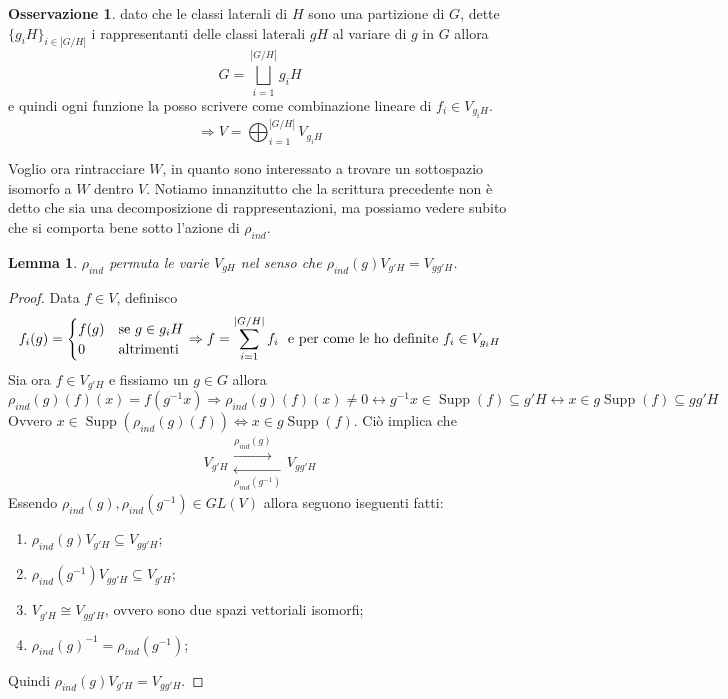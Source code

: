 \documentclass[11pt]{article}
\theoremstyle{plain}
\newtheorem{lemma}[thm]{Lemma}
\theoremstyle{definition}
\newtheorem*{rem}{Osservazione}
\theoremstyle{remark}
\DeclareMathOperator{\Supp}{Supp}
\begin{document}
\begin{rem} dato che le classi laterali di $H$ sono una partizione di $G$, dette $\{g_iH\}_{i\in |G/H|}$ i rappresentanti delle classi laterali $gH$ al variare di $g$ in $G$ allora
\[G=\bigsqcup_{i=1}^{|G/H|} g_iH\]
e quindi ogni funzione la posso scrivere come combinazione lineare di $f_i\in V_{g_iH}$.
\[\Rightarrow V=\bigoplus_{i=1}^{|G/H|} V_{g_iH}\]
\end{rem}
Voglio ora rintracciare $W$, in quanto sono interessato a trovare un sottospazio isomorfo a $W$ dentro $V$. Notiamo innanzitutto che la scrittura precedente non è detto che sia una decomposizione di rappresentazioni, ma possiamo vedere subito che si comporta bene sotto l'azione di $\rho_{ind}$.

\begin{lemma}
$\rho_{ind}$ permuta le varie $V_{gH}$ nel senso che $\rho_{ind}(g)V_{g'H}=V_{gg'H}$.
\end{lemma}

\begin{proof} Data $f\in V$, definisco
  \[f_i(g)=\begin{cases}
    f(g)& \textup{se } g\in g_iH\\
    0& \textup{altrimenti}
  \end{cases}\Rightarrow f=\sum_{i=1}^{|G/H|} f_i\ \textup{ e per come le ho definite } f_i\in V_{g_iH}\]
  Sia ora $f\in V_{g'H}$ e fissiamo un $g\in G$ allora
  \[\rho_{ind}(g)(f)(x)=f(g^{-1}x)\Rightarrow \rho_{ind}(g)(f)(x)\neq 0\leftrightarrow g^{-1}x\in \Supp(f)\subseteq g'H\leftrightarrow x\in g\Supp(f)\subseteq gg'H\]
  Ovvero $x\in \Supp(\rho_{ind}(g)(f))\Leftrightarrow x\in g\Supp(f)$. Ciò implica che
  \[ V_{g'H} \begin{matrix}
    \overset{\rho_{ind}(g)}{\longrightarrow}\\
    \underset{\rho_{ind}(g^{-1})}{\longleftarrow}
  \end{matrix} V_{gg'H} \]
  Essendo $\rho_{ind}(g),\rho_{ind}(g^{-1})\in GL(V)$ allora seguono iseguenti fatti:
  \begin{enumerate}
  \item $\rho_{ind}(g)V_{g'H}\subseteq V_{gg'H}$;
  \item $\rho_{ind}(g^{-1})V_{gg'H}\subseteq V_{g'H}$;
  \item $V_{g'H}\cong V_{gg'H}$, ovvero sono due spazi vettoriali isomorfi;
  \item $\rho_{ind}(g)^{-1}=\rho_{ind}(g^{-1})$;
  \end{enumerate}
  Quindi $\rho_{ind}(g)V_{g'H}=V_{gg'H}$.
\end{proof}
\end{document}
